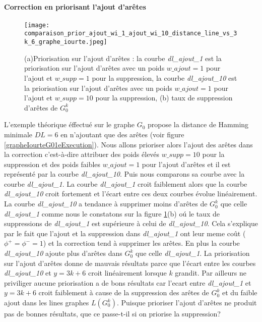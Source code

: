 \documentclass[onecolumn, 12pt]{book}
\begin{document}
\paragraph{Correction en priorisant l'ajout d'ar\^etes} %
\begin{figure}[htb!] 
\centering
\texttt{[image: comparaison\_prior\_ajout\_wi\_1\_ajout\_wi\_10\_distance\_line\_vs\_3k\_6\_graphe\_iourte.jpeg]}
\caption{(a)Priorisation sur l'ajout d'ar\^etes : la courbe {\em dl\_ajout\_1} est la priorisation sur l'ajout d'ar\^etes avec un poids $w\_ajout=1$ pour l'ajout et $w\_supp = 1$ pour la suppression,   la courbe {\em dl\_ajout\_10} est la priorisation sur l'ajout d'ar\^etes avec un poids $w\_ajout=1$ pour l'ajout et $w\_supp = 10$ pour la suppression, (b) taux de suppression d'ar\^etes de $G_0^k$}
\label{priorAjout1Ajout10} 
\end{figure}
L'exemple th\'eorique \'effectu\'e sur le graphe $G_0$ propose la distance de Hamming minimale $DL= 6$ en n'ajoutant que des ar\^etes (voir figure \ref{grapheIourteG01eExecution}).
Nous allons prioriser alors l'ajout des ar\^etes dans la correction c'est-\`a-dire attribuer des poids \'elev\'es  $w\_supp = 10$ pour la suppression et des poids faibles $w\_ajout = 1$ pour l'ajout d'ar\^etes et il est repr\'esent\'e par la courbe {\em dl\_ajout\_10}. Puis nous comparons sa courbe  avec la courbe {\em dl\_ajout\_1}.
\newline
La courbe {\em dl\_ajout\_1} croit faiblement alors que la courbe {\em dl\_ajout\_10}  croit fortement et l'\'ecart entre ces deux courbes \'evolue lin\'eairement.
La courbe  {\em dl\_ajout\_10} a tendance \`a supprimer moins d'ar\^etes de $G_0^k$ que celle {\em dl\_ajout\_1} comme nous le constatons sur la figure \ref{priorAjout1Ajout10}(b) o\'u le taux de suppressions de {\em dl\_ajout\_1} est sup\'erieure \`a celui de {\em dl\_ajout\_10}. Cela s'explique par le fait que l'ajout et la suppression dans {\em dl\_ajout\_1} ont leur meme co\^ut ($\phi^{+} = \phi^{-} = 1$) et la correction tend \`a supprimer les ar\^etes. En plus la courbe {\em dl\_ajout\_10} ajoute plus d'ar\^etes dans $G_0^k$ que  celle {\em dl\_ajout\_1}.
\newline
La priorisation sur l'ajout d'ar\^etes donne de mauvais r\'esultats parce que l'\'ecart entre les courbes {\em dl\_ajout\_10} et $y=3k+6$ croit lin\'eairement lorsque $k$ grandit.
Par ailleurs ne priviliger aucune priorisation a de bons r\'esultats car l'ecart entre {\em dl\_ajout\_1} et $y=3k+6$ croit faiblement \`a cause de la suppression des ar\^etes de $G_0^k$ et du faible ajout dans les lines graphes $L(G_0^k)$.
\newline 
Puisque prioriser l'ajout d'ar\^etes ne produit pas de bonnes r\'esultats, que ce passe-t-il si on priorise la suppression?   
\end{document}
